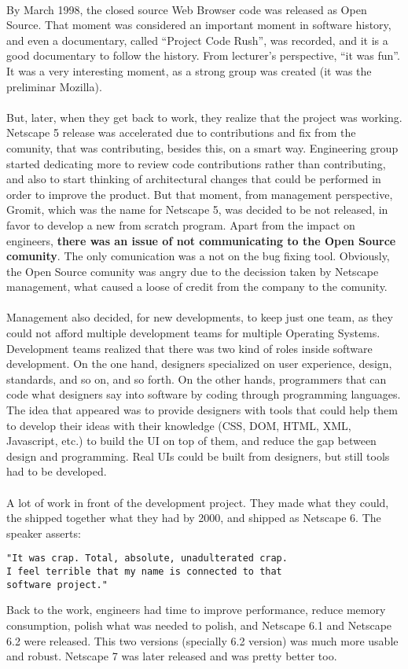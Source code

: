 \documentclass[11pt]{article}
\begin{document}
\\
By March 1998, the closed source Web Browser code was released as Open Source. That moment was considered an important moment in software history, and even a documentary, called ``Project Code Rush'', was recorded, and it is a good documentary to follow the history. From lecturer's perspective, ``it was fun''. It was a very interesting moment, as a strong group was created (it was the preliminar Mozilla).\\
\\
But, later, when they get back to work, they realize that the project was working. Netscape 5 release was accelerated due to contributions and fix from the comunity, that was contributing, besides this, on a smart way. Engineering group started dedicating more to review code contributions rather than contributing, and also to start thinking of architectural changes that could be performed in order to improve the product. But that moment, from management perspective, Gromit, which was the name for Netscape 5, was decided to be not released, in favor to develop a new from scratch program. Apart from the impact on engineers, \textbf{there was an issue of not communicating to the Open Source comunity}. The only comunication was a not on the bug fixing tool. Obviously, the Open Source comunity was angry due to the decission taken by Netscape management, what caused a loose of credit from the company to the comunity.\\
\\
Management also decided, for new developments, to keep just one team, as they could not afford multiple development teams for multiple Operating Systems. Development teams realized that there was two kind of roles inside software development. On the one hand, designers specialized on user experience, design, standards, and so on, and so forth. On the other hands, programmers that can code what designers say into software by coding through programming languages. The idea that appeared was to provide designers with tools that could help them to develop their ideas with their knowledge (CSS, DOM, HTML, XML, Javascript, etc.) to build the UI on top of them, and reduce the gap between design and programming. Real UIs could be built from designers, but still tools had to be developed.\\
\\
A lot of work in front of the development project. They made what they could, the shipped together what they had by 2000, and shipped as Netscape 6. The speaker asserts:
\begin{verbatim}
"It was crap. Total, absolute, unadulterated crap.
I feel terrible that my name is connected to that
software project."
\end{verbatim}
Back to the work, engineers had time to improve performance, reduce memory consumption, polish what was needed to polish, and Netscape 6.1 and Netscape 6.2 were released. This two versions (specially 6.2 version) was much more usable and robust. Netscape 7 was later released and was pretty better too.
\end{document}
